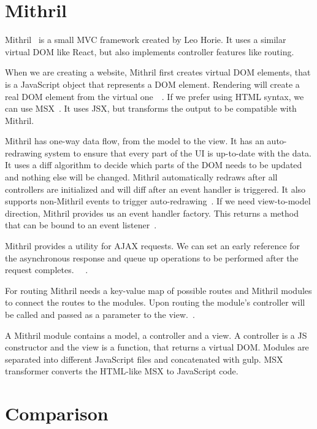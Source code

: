 \section{Mithril}

Mithril~\cite{Mithril} is a small MVC framework created by Leo Horie. It uses a similar virtual DOM like React, but also implements controller features like routing.

When we are creating a website, Mithril first creates virtual DOM elements, that is a JavaScript object that represents a DOM element. Rendering will create a real DOM element from the virtual one~\cite{Mithril-m}~\cite{Mithril-render}. If we prefer using HTML syntax, we can use MSX~\cite{MSX}. It uses JSX, but transforms the output to be compatible with Mithril. 

Mithril has one-way data flow, from the model to the view. It has an auto-redrawing system to ensure that every part of the UI is up-to-date with the data. It uses a diff algorithm to decide which parts of the DOM needs to be updated and nothing else will be changed. Mithril automatically redraws after all controllers are initialized and will diff after an event handler is triggered. It also supports non-Mithril events to trigger auto-redrawing~\cite{Mithril-redraw}. If we need view-to-model direction, Mithril provides us an event handler factory. This returns a method that can be bound to an event listener~\cite{Mithril-withAttr}.


Mithril provides a utility for AJAX requests. We can set an early reference for the asynchronous response and queue up operations to be performed after the request completes.  ~\cite{Mithril-webservice}~\cite{Mithril-request}.


For routing Mithril needs a key-value map of possible routes and Mithril modules to connect the routes to the modules. Upon routing the module's controller will be called and passed as a parameter to the view.~\cite{Mithril-routing}.

A Mithril module contains a model, a controller and a view. A controller is a JS constructor and the view is a function, that returns a virtual DOM. Modules are separated into different JavaScript files and concatenated with gulp. MSX transformer converts the HTML-like MSX to JavaScript code.

\section{Comparison}


